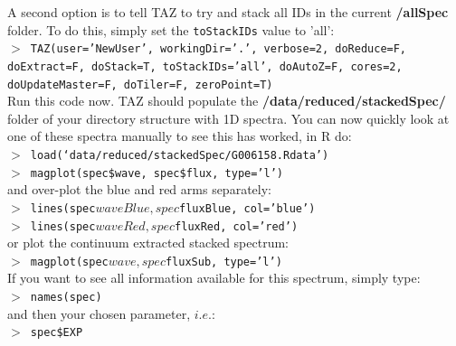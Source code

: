 \documentclass[12pt]{article}
\begin{document}
 A second option is to tell TAZ to try and stack all IDs in the current \textbf{/allSpec} folder. To do this, simply set the \texttt{toStackIDs} value to 'all': \\
  

  \hspace{10mm} \texttt{$>$ TAZ(user='NewUser', workingDir='.', verbose=2, doReduce=F, doExtract=F, doStack=T,  toStackIDs='all', doAutoZ=F, cores=2, doUpdateMaster=F, doTiler=F, zeroPoint=T)}\\   

Run this code now. TAZ should populate the \textbf{/data/reduced/stackedSpec/} folder of your directory structure with 1D spectra. You can now quickly look at one of these spectra manually to see this has worked, in R do:\\

\hspace{10mm} \texttt{$>$ load(`data/reduced/stackedSpec/G006158.Rdata')} \\
\hspace{10mm} \texttt{$>$ magplot(spec\$wave, spec\$flux, type='l')} \\

and over-plot the blue and red arms separately:\\


\hspace{10mm} \texttt{$>$ lines(spec$waveBlue, spec$fluxBlue, col='blue')}\\
\hspace{10mm} \texttt{$>$ lines(spec$waveRed, spec$fluxRed, col='red')}\\

or plot the continuum extracted stacked spectrum:\\

\hspace{10mm} \texttt{$>$ magplot(spec$wave,spec$fluxSub, type='l')}\\

If you want to see all information available for this spectrum, simply type:\\

 \hspace{10mm} \texttt{$>$ names(spec)} \\
 
 and then your chosen parameter, $i.e.$:\\
 
 
  \hspace{10mm} \texttt{$>$ spec\$EXP} \\
  
\end{document}
